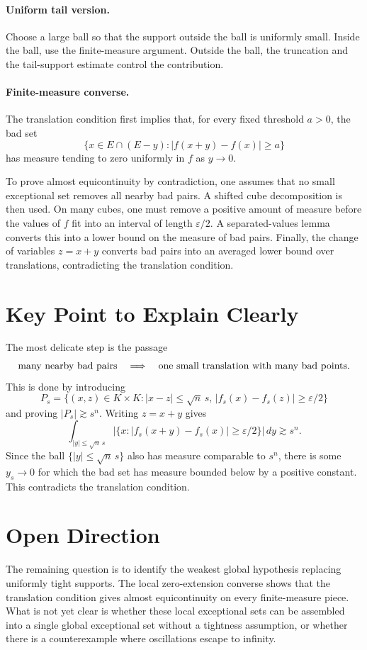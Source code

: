 \documentclass[11pt]{article}
\newcommand{\eps}{\varepsilon}
\newcommand{\meas}[1]{\lvert #1\rvert}
\begin{document}
\paragraph{Uniform tail version.}
Choose a large ball so that the support outside the ball is uniformly small.
Inside the ball, use the finite-measure argument. Outside the ball, the
truncation and the tail-support estimate control the contribution.

\paragraph{Finite-measure converse.}
The translation condition first implies that, for every fixed threshold
$a>0$, the bad set
\[
    \{x\in E\cap(E-y): |f(x+y)-f(x)|\ge a\}
\]
has measure tending to zero uniformly in $f$ as $y\to0$.

To prove almost equicontinuity by contradiction, one assumes that no small
exceptional set removes all nearby bad pairs. A shifted cube decomposition is
then used. On many cubes, one must remove a positive amount of measure before
the values of $f$ fit into an interval of length $\eps/2$. A separated-values
lemma converts this into a lower bound on the measure of bad pairs. Finally,
the change of variables $z=x+y$ converts bad pairs into an averaged lower
bound over translations, contradicting the translation condition.

\section*{Key Point to Explain Clearly}

The most delicate step is the passage
\[
    \hbox{many nearby bad pairs}
    \quad\Longrightarrow\quad
    \hbox{one small translation with many bad points}.
\]
This is done by introducing
\[
    P_s=
    \{(x,z)\in K\times K: |x-z|\le \sqrt n\,s,\,
    |f_s(x)-f_s(z)|\ge\eps/2\}
\]
and proving $\meas{P_s}\gtrsim s^n$. Writing $z=x+y$ gives
\[
    \int_{|y|\le\sqrt n\,s}
    \meas{\{x: |f_s(x+y)-f_s(x)|\ge\eps/2\}}\,dy
    \gtrsim s^n.
\]
Since the ball $\{|y|\le\sqrt n\,s\}$ also has measure comparable to $s^n$,
there is some $y_s\to0$ for which the bad set has measure bounded below by a
positive constant. This contradicts the translation condition.

\section*{Open Direction}

The remaining question is to identify the weakest global hypothesis replacing
uniformly tight supports. The local zero-extension converse shows that the
translation condition gives almost equicontinuity on every finite-measure
piece. What is not yet clear is whether these local exceptional sets can be
assembled into a single global exceptional set without a tightness assumption,
or whether there is a counterexample where oscillations escape to infinity.
\end{document}
